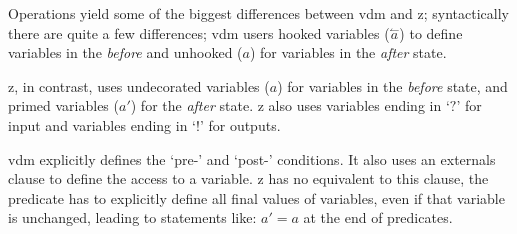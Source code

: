 \documentclass[a4paper, 10pt, notitlepage, fleqn]{article}
\begin{document}
Operations yield some of the biggest differences between \gls{vdm} and \gls{z}; syntactically
there are quite a few differences; \gls{vdm} users hooked variables 
($\overset{\leftharpoonup}{a}$) to define variables in the \textit{before} and unhooked ($a$) for
variables in the \textit{after} state.

\Gls{z}, in contrast, uses undecorated variables ($a$) for variables in the \textit{before} state,
and primed variables ($a'$) for the \textit{after} state. \Gls{z} also uses variables ending in 
`$?$' for input and variables ending in `$!$' for outputs.

\Gls{vdm} explicitly defines the `pre-' and `post-' conditions. It also uses an externals clause
to define the access to a variable. \Gls{z} has no equivalent to this clause, the predicate has to
explicitly define all final values of variables, even if that variable is unchanged, leading to
statements like: $a' = a$ at the end of predicates.





\end{document}
